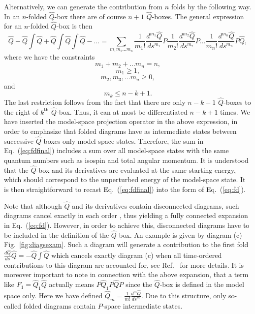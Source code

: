 \documentclass{article}
\begin{document}
Alternatively, we can generate the contribution
from $n$ folds by the following way. In
an $n$-folded $\hat{Q}$-box there are of course $n+1$ $\hat{Q}$-boxes. The
general expression for an $n$-folded $\hat{Q}$-box is then
\begin{equation}
        \hat{Q}   -\hat{Q}\int\hat{Q}
    +\hat{Q}\int\hat{Q}\int\hat{Q} -\dots=
    {\displaystyle\sum_{m_1m_2\dots m_n}}
    \frac{1}{m_1!}\frac{d^{m_1}\hat{Q}}{ds^{m_1}}P
    \frac{1}{m_2!}\frac{d^{m_2}\hat{Q}}{ds^{m_2}}P
    \dots
    \frac{1}{m_n!}\frac{d^{m_n}\hat{Q}}{ds^{m_n}}P\hat{Q},
\label{eq:fdfinal}
\end{equation}
where we have the constraints
\[
  m_1+m_2+\dots m_n=n,
\]
\[
m_1\geq 1,
\]
\[
m_2, m_3, \dots m_n \geq 0,
\]
and
\[
m_k \leq n-k+1.
\]
The last restriction follows from the fact that there are only
$n-k+1$ $\hat{Q}$-boxes to the right of $k^{\mathrm{th}}$ $\hat{Q}$-box.
Thus, it can at most be differentiated $n-k+1$ times.
We have inserted the model-space projection operator in the above
expression, in order to emphasize that folded diagrams have as intermediate
states between successive $\hat{Q}$-boxes
only model-space states. Therefore, the sum in Eq.\ (\ref{eq:fdfinal})
includes a sum over all model-space states with the same quantum
numbers such as isospin and total angular momentum. It is understood
that the $\hat{Q}$-box  and its derivatives are evaluated at the
same starting energy, which should correspond to the unperturbed
energy of the model-space state.
It is then straightforward to recast Eq.\ (\ref{eq:fdfinal})
into the form of Eq.\ (\ref{eq:fd}).

Note that although $\hat{Q}$ and its derivatives contain disconnected
diagrams, such diagrams cancel exactly in each order \cite{ko90}, thus
yielding a fully connected expansion in Eq.\ (\ref{eq:fd}).
However, in order to achieve this, disconnected diagrams have
to be included in the definition of the $\hat{Q}$-box. An example
is given by diagram (c) Fig.\ \ref{fig:diagsexam}.
Such a diagram will generate a contribution to
the first fold $\frac{d\hat{Q}}{ds}\hat{Q}=-\hat{Q}\int\hat{Q} $
which cancels exactly diagram (c) when all time-ordered
contributions to this diagram are accounted for, see Ref.\ \cite{ko90}
for more details.
It is moreover important to note in connection with the above
expansion, that a term like
$F_1= \hat{Q}_1 \hat{Q}$ actually means $P\hat{Q}_1 P\hat{Q}P$ since
the $\hat{Q}$-box is defined in the model space only. Here we have defined
$\hat{Q}_{m}=\frac{1}{m!}\frac{d^{m}\hat{Q}}
{ds^{m}}$.
Due to this structure, only so-called folded diagrams
contain $P$-space intermediate states.
\end{document}
